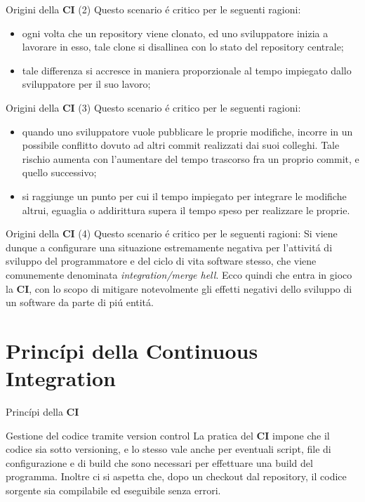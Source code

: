 \documentclass{beamer}
\begin{document}
\begin{frame}{Origini della \textbf{CI} (2)}
Questo scenario \'e critico per le seguenti ragioni:
\begin{itemize}
\item ogni volta che un repository viene clonato, ed uno sviluppatore inizia a lavorare in esso, tale clone si disallinea con lo stato del repository centrale;
\item tale differenza si accresce in maniera proporzionale al tempo impiegato dallo sviluppatore per il suo lavoro;
\end{itemize}
\end{frame}


\begin{frame}{Origini della \textbf{CI} (3)}
Questo scenario \'e critico per le seguenti ragioni:
\begin{itemize}
\item quando uno sviluppatore vuole pubblicare le proprie modifiche, incorre in un possibile conflitto dovuto ad altri commit realizzati dai suoi colleghi. Tale rischio aumenta con l'aumentare del tempo trascorso fra un proprio commit, e quello successivo;
\item si raggiunge un punto per cui il tempo impiegato per integrare le modifiche altrui, eguaglia o addirittura supera il tempo speso per realizzare le proprie.
\end{itemize}
\end{frame}


\begin{frame}{Origini della \textbf{CI} (4)}
Questo scenario \'e critico per le seguenti ragioni:
Si viene dunque a configurare una situazione estremamente negativa per l'attivit\'a di sviluppo del programmatore e
del ciclo di vita software stesso, che viene comunemente denominata \emph{integration/merge hell}.
\newline
Ecco quindi che entra in gioco la \textbf{CI}, con lo scopo di mitigare notevolmente gli effetti negativi dello sviluppo di un
software da parte di pi\'u entit\'a.
\end{frame}


\section{Princ\'ipi della Continuous Integration}
\begin{frame}{Princ\'ipi della \textbf{CI}}
\begin{block}{Gestione del codice tramite version control}
La pratica del \textbf{CI} impone che il codice sia sotto versioning, e lo stesso vale anche per eventuali script, file di
configurazione e di build che sono necessari per effettuare una build del programma. Inoltre ci si aspetta che, dopo un checkout
dal repository, il codice sorgente sia compilabile ed eseguibile senza errori.
\end{block}
\end{frame}
\end{document}
